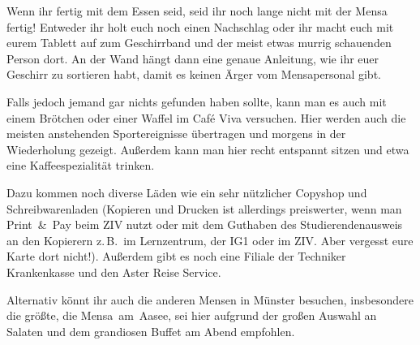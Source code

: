 \begin{multicols*}{2}
Wenn ihr fertig mit dem Essen seid, seid ihr noch lange nicht mit der Mensa fertig!
Entweder ihr holt euch noch einen Nachschlag oder ihr macht euch mit eurem Tablett auf zum Geschirrband und der meist etwas murrig schauenden Person dort.
An der Wand hängt dann eine genaue Anleitung, wie ihr euer Geschirr zu sortieren habt, damit es keinen Ärger vom Mensapersonal gibt.


Falls jedoch jemand gar nichts gefunden haben sollte, kann man es auch mit einem Brötchen oder einer Waffel im Café Viva versuchen.
Hier werden auch die meisten anstehenden Sportereignisse übertragen und morgens in der Wiederholung gezeigt.
Außerdem kann man hier recht entspannt sitzen und etwa eine Kaffeespezialität trinken.


Dazu kommen noch diverse Läden wie ein sehr nützlicher Copyshop und Schreibwarenladen (Kopieren und Drucken ist allerdings preiswerter, wenn man Print~\&~Pay beim ZIV nutzt oder mit dem Guthaben des Studierendenausweis an den Kopierern z.\,B.\ im Lernzentrum, der IG1 oder im ZIV. Aber vergesst eure Karte dort nicht!). Außerdem gibt es noch eine Filiale der Techniker Krankenkasse und den Aster Reise Service.

Alternativ könnt ihr auch die anderen Mensen in Münster besuchen, insbesondere die größte, die Mensa~am~Aasee, sei hier aufgrund der großen Auswahl an Salaten und dem grandiosen Buffet am Abend empfohlen.

\end{multicols*}
